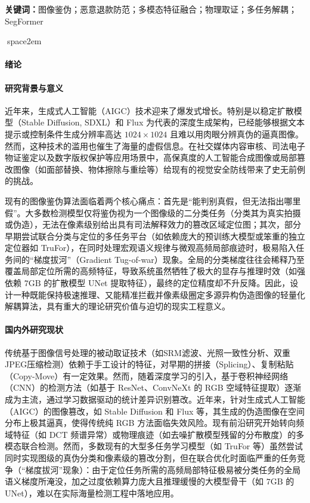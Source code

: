\documentclass[10pt,a4paper,twocolumn]{ctexart}
\begin{document}
\vspace{2em}
\noindent\textbf{关键词：}图像鉴伪；恶意退款防范；多模态特征融合；物理取证；多任务解耦；SegFormer



space{2em}

\newpage
\tableofcontents
\newpage


\paragraph{绪论}

\paragraph{研究背景与意义}
近年来，生成式人工智能（AIGC）技术迎来了爆发式增长。特别是以稳定扩散模型（Stable Diffusion, SDXL）和 Flux 为代表的深度生成架构，已经能够根据文本提示或控制条件生成分辨率高达 $1024 \times 1024$ 且难以用肉眼分辨真伪的逼真图像。然而，这种技术的滥用也催生了海量的虚假信息。在社交媒体内容审核、司法电子物证鉴定以及数字版权保护等应用场景中，高保真度的人工智能合成图像或局部篡改图像（如面部替换、物体擦除与重绘等）给现有的视觉安全防线带来了史无前例的挑战。

现有的图像鉴伪算法面临着两个核心痛点：首先是“能判别真假，但无法指出哪里假”。大多数检测模型仅将鉴伪视为一个图像级的二分类任务（分类其为真实拍摄或伪造），无法在像素级别给出具有司法解释效力的篡改区域定位图；其次，部分早期尝试联合分类与定位的多任务平台（如依赖庞大的预训练大模型或笨重的独立定位器如 TruFor），在同时处理宏观语义规律与微观高频局部痕迹时，极易陷入任务间的“梯度拔河”（Gradient Tug-of-war）现象。全局的分类梯度往往会稀释乃至覆盖局部定位所需的高频特征，导致系统虽然牺牲了极大的显存与推理时效（如强依赖 $7\text{GB}$ 的扩散模型 UNet 提取特征），最终的定位精度却不升反降。因此，设计一种既能保持极速推理、又能精准拦截并像素级圈定多源异构伪造图像的轻量化解耦算法，具有重大的理论研究价值与迫切的现实工程意义。

\paragraph{国内外研究现状}
传统基于图像信号处理的被动取证技术（如SRM滤波、光照一致性分析、双重JPEG压缩检测）依赖于手工设计的特征，对早期的拼接（Splicing）、复制粘贴（Copy-Move）有一定效果。然而，随着深度学习的引入，基于卷积神经网络（CNN）的检测方法（如基于 ResNet、ConvNeXt 的 RGB 空域特征提取）逐渐成为主流，通过学习数据驱动的统计差异识别篡改。近年来，针对生成式人工智能（AIGC）的图像篡改，如 Stable Diffusion 和 Flux 等，其生成的伪造图像在空间分布上极其逼真，使得传统纯 RGB 方法面临失效风险。现有前沿研究开始转向频域特征（如 DCT 频谱异常）或物理痕迹（如去噪扩散模型残留的分布散度）的多模态联合检测。然而，多数现有的大型多任务学习模型（如 TruFor 等）虽然尝试同时实现图级的真伪分类和像素级的篡改分割，但在联合优化时面临严重的任务竞争（“梯度拔河”现象）：由于定位任务所需的高频局部特征极易被分类任务的全局语义梯度所淹没，加之过度依赖算力庞大且推理缓慢的大模型骨干（如 $7\text{GB}$ 的 UNet），难以在实际海量检测工程中落地应用。
\end{document}
